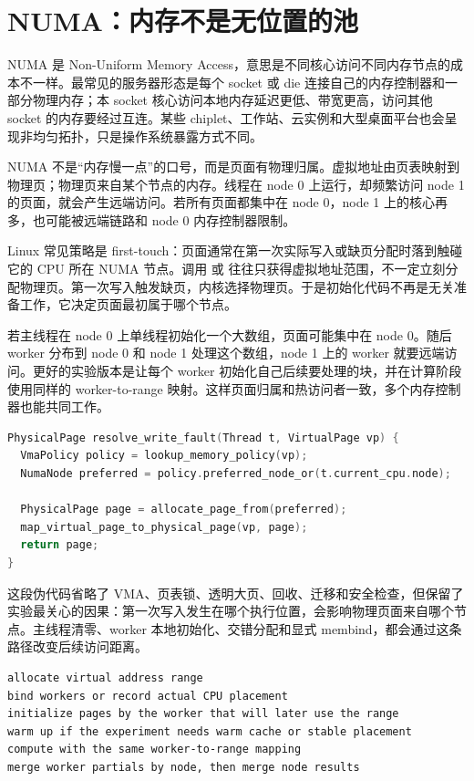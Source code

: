 \section{NUMA：内存不是无位置的池}

NUMA 是 Non-Uniform Memory Access，意思是不同核心访问不同内存节点的成本不一样。最常见的服务器形态是每个 socket 或 die 连接自己的内存控制器和一部分物理内存；本 socket 核心访问本地内存延迟更低、带宽更高，访问其他 socket 的内存要经过互连。某些 chiplet、工作站、云实例和大型桌面平台也会呈现非均匀拓扑，只是操作系统暴露方式不同。

NUMA 不是“内存慢一点”的口号，而是页面有物理归属。虚拟地址由页表映射到物理页；物理页来自某个节点的内存。线程在 node 0 上运行，却频繁访问 node 1 的页面，就会产生远端访问。若所有页面都集中在 node 0，node 1 上的核心再多，也可能被远端链路和 node 0 内存控制器限制。

Linux 常见策略是 first-touch：页面通常在第一次实际写入或缺页分配时落到触碰它的 CPU 所在 NUMA 节点。调用  或  往往只获得虚拟地址范围，不一定立刻分配物理页。第一次写入触发缺页，内核选择物理页。于是初始化代码不再是无关准备工作，它决定页面最初属于哪个节点。

若主线程在 node 0 上单线程初始化一个大数组，页面可能集中在 node 0。随后 worker 分布到 node 0 和 node 1 处理这个数组，node 1 上的 worker 就要远端访问。更好的实验版本是让每个 worker 初始化自己后续要处理的块，并在计算阶段使用同样的 worker-to-range 映射。这样页面归属和热访问者一致，多个内存控制器也能共同工作。

\begin{lstlisting}[language=C++,caption={first-touch 缺页放置的抽象流程}]
PhysicalPage resolve_write_fault(Thread t, VirtualPage vp) {
  VmaPolicy policy = lookup_memory_policy(vp);
  NumaNode preferred = policy.preferred_node_or(t.current_cpu.node);

  PhysicalPage page = allocate_page_from(preferred);
  map_virtual_page_to_physical_page(vp, page);
  return page;
}
\end{lstlisting}

这段伪代码省略了 VMA、页表锁、透明大页、回收、迁移和安全检查，但保留了实验最关心的因果：第一次写入发生在哪个执行位置，会影响物理页面来自哪个节点。主线程清零、worker 本地初始化、交错分配和显式 membind，都会通过这条路径改变后续访问距离。

\begin{lstlisting}[numbers=none,caption={NUMA 实验的阶段分解}]
allocate virtual address range
bind workers or record actual CPU placement
initialize pages by the worker that will later use the range
warm up if the experiment needs warm cache or stable placement
compute with the same worker-to-range mapping
merge worker partials by node, then merge node results
\end{lstlisting}


